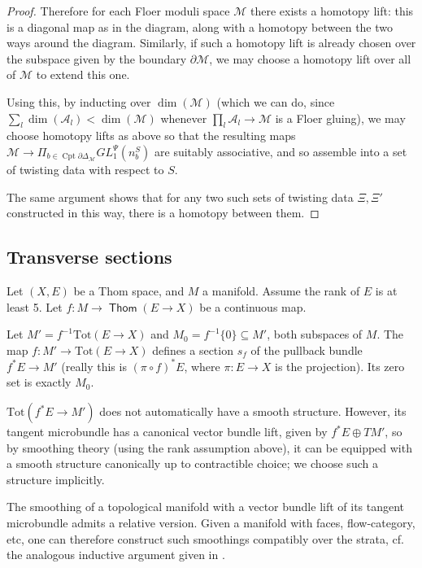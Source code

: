 \documentclass{TPmod}
\newcommand{\Tot}{\mathrm{Tot}}
\newcommand{\Cptd}{\operatorname{Cpt}\partial}
\DeclareMathOperator{\Thom}{\mathsf{Thom}}
\newcommand{\cA}{\mathcal{A}}
\newcommand{\cM}{\mathcal{M}}
\numberwithin{equation}{section}
\begin{document}
\begin{proof}
        Therefore for each Floer moduli space $\cM$ there exists a homotopy lift: this is a diagonal map as in the diagram, along with a homotopy between the two ways around the diagram. Similarly, if such a homotopy lift is already chosen over the subspace given by the boundary $\partial \cM$, we may choose a homotopy lift over all of $\cM$ to extend this one.

        Using this, by inducting over  $\dim(\cM)$ (which we can do, since $\sum_l \dim(\cA_l) < \dim(\cM)$ whenever $\prod_l \cA_l \to \cM$ is a Floer gluing), we may choose homotopy lifts as above so that the resulting maps $\cM \to \Pi_{b \in \Cptd\Delta_\cM} GL_1^\Psi(n^S_b)$ are suitably associative, and so assemble into a set of twisting data with respect to $S$.

        The same argument shows that for any two such sets of twisting data $\Xi, \Xi'$ constructed in this way, there is a homotopy between them.
    \end{proof}

\subsection{Transverse sections}
    
    Let $(X, E)$ be a Thom space, and $M$ a manifold. Assume the rank of $E$ is at least 5. Let $f: M \to \Thom(E \to X)$ be a continuous map. 

    Let $M' = f^{-1}\Tot(E \to X)$ and $M_0 = f^{-1} \{0\} \subseteq M'$, both subspaces of $M$. The map $f: M' \to \Tot(E \to X)$ defines a section $s_f$ of the pullback bundle $f^*E \to M'$ (really this is $(\pi \circ f)^* E$, where $\pi: E \to X$ is the projection). Its zero set is exactly $M_0$.

    $\Tot(f^*E \to M')$ does not automatically have a smooth structure. However, its tangent microbundle has a canonical vector bundle lift, given by $f^*E \oplus TM'$, so by smoothing theory (using the rank assumption above), it  can be equipped with a smooth structure canonically up to contractible choice; we choose such a structure implicitly.

    \begin{rmk}
        The smoothing of a topological manifold with a vector bundle lift of its tangent microbundle admits a relative version.  Given a manifold with faces,  flow-category,  etc, one can therefore construct such smoothings compatibly over the strata, cf. the analogous inductive argument given in \cite{Bai-Xu}.
    \end{rmk}
\end{document}
